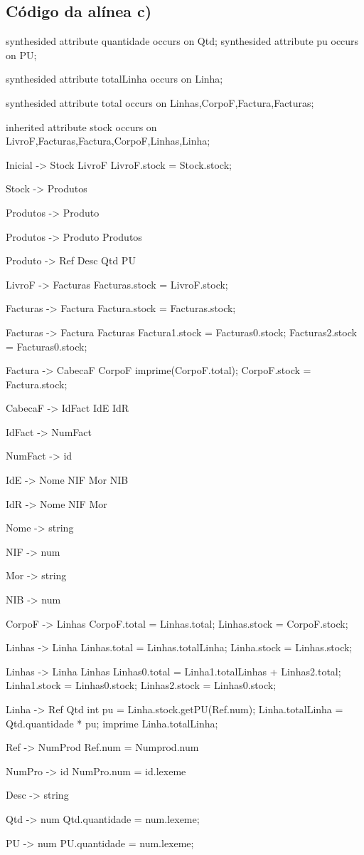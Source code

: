 \documentclass[11pt,a4paper]{article}
\begin{document}
\subsection{Código da alínea c)}
\begin{code_txt} 
synthesided attribute quantidade occurs on Qtd;
synthesided attribute pu occurs on PU;

synthesided attribute totalLinha occurs on Linha;

synthesided attribute total occurs on Linhas,CorpoF,Factura,Facturas;

inherited attribute stock occurs on LivroF,Facturas,Factura,CorpoF,Linhas,Linha;



Inicial -> Stock LivroF { LivroF.stock = Stock.stock; }

Stock -> Produtos

Produtos -> Produto

Produtos -> Produto Produtos

Produto -> Ref Desc Qtd PU

LivroF -> Facturas { Facturas.stock = LivroF.stock;}

Facturas -> Factura {Factura.stock = Facturas.stock;}

Facturas -> Factura Facturas {Factura1.stock = Facturas0.stock; Facturas2.stock = Facturas0.stock;} 

Factura -> CabecaF CorpoF { imprime(CorpoF.total); CorpoF.stock = Factura.stock;}

CabecaF -> IdFact IdE IdR

IdFact -> NumFact

NumFact -> id

IdE -> Nome NIF Mor NIB

IdR -> Nome NIF Mor

Nome -> string

NIF -> num

Mor -> string

NIB -> num

CorpoF -> Linhas {CorpoF.total = Linhas.total; Linhas.stock = CorpoF.stock;} 

Linhas -> Linha {Linhas.total = Linhas.totalLinha; Linha.stock = Linhas.stock;}

Linhas -> Linha Linhas {Linhas0.total = Linha1.totalLinhas + Linhas2.total; Linha1.stock = Linhas0.stock; Linhas2.stock = Linhas0.stock; } 

Linha -> Ref Qtd {  int pu = Linha.stock.getPU(Ref.num);
 					Linha.totalLinha = Qtd.quantidade * pu;
					imprime Linha.totalLinha;
						}

Ref -> NumProd { Ref.num = Numprod.num}

NumPro -> id {NumPro.num = id.lexeme}

Desc -> string

Qtd -> num  { Qtd.quantidade = num.lexeme;}

PU -> num	{ PU.quantidade = num.lexeme;}




\end{code_txt} 
\newpage
\end{document}

